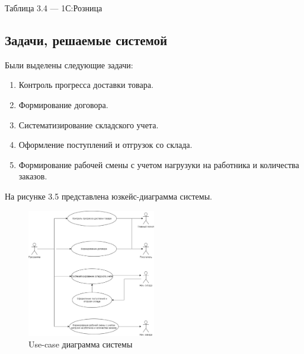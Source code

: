 Таблица 3.4 --- 1С:Розница
\begin{table}[h!]
\end{table}

\subsection{Задачи, решаемые системой}

Были выделены следующие задачи:

\begin{enumerate}
\item{Контроль прогресса доставки товара.}
\item{Формирование договора.}
\item{Систематизирование складского учета.}
\item{Оформление поступлений и отгрузок со склада.}
\item{Формирование рабочей смены с учетом нагрузуки на работника и количества заказов.}
\end{enumerate}

На рисунке 3.5 представлена юзкейс-диаграмма системы.

\begin{figure}[h!]
        \centering
        \includegraphics[width=0.5\textwidth]{images/3/usecase.eps}
        \caption{Use-case диаграмма системы}
\end{figure}

